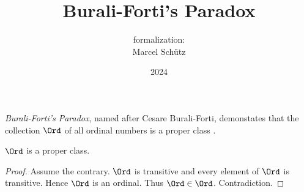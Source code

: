 \documentclass{article}
\title{Burali-Forti's Paradox}
\author{\Naproche formalization:\\[0.5em]Marcel Schütz}
\date{2024}
\begin{document}
  \maketitle

  
  \noindent \emph{Burali-Forti's Paradox}, named after Cesare Burali-Forti, 
  demonstates that the collection $\Ord$ of all ordinal numbers is a
  proper class \cite{BuraliForti1897}.

  \begin{forthel}
    \begin{theorem*}[title=Burali-Forti's Paradox,id=burali_forti_paradox]
      $\Ord$ is a proper class.
    \end{theorem*}
    \begin{proof}
      Assume the contrary.
      $\Ord$ is transitive and every element of $\Ord$ is transitive.
      Hence $\Ord$ is an ordinal.
      Thus $\Ord \in \Ord$.
      Contradiction.
    \end{proof}
  \end{forthel}

  \printbibliography
\end{document}
